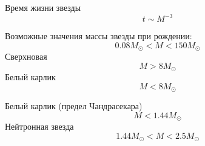 Время жизни звезды \begin{equation}
t\sim M^{-3}
\end{equation}

Возможные значения массы звезды при рождении:
\begin{equation}
0.08M_{\odot}<M<150M_{\odot}
\end{equation}
Сверхновая
\begin{equation}
M>8M_{\odot}
\end{equation}
Белый карлик
\begin{equation}
M<8M_{\odot}
\end{equation}
 
Белый карлик (предел Чандрасекара) \begin{equation}
M<1.44M_{\odot}
\end{equation}
Нейтронная звезда
\begin{equation}
1.44M_{\odot}<M<2.5M_{\odot}
\end{equation}
